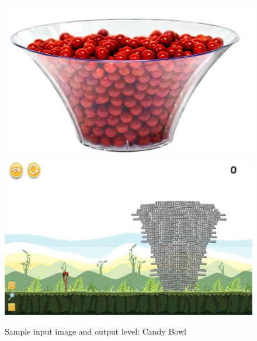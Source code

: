 \documentclass{dalthesis}
\begin{document}
\begin{figure}
	\caption{Sample input image and output level: Candy Bowl}
  \includegraphics[width=\textwidth,height=\textheight,keepaspectratio]{levels/pictures/halloween/candy_bowl.jpg}
  \includegraphics[width=\textwidth,height=\textheight,keepaspectratio]{levels/screenshots/halloween/candy_bowl.png}
\end{figure}
\end{document}
